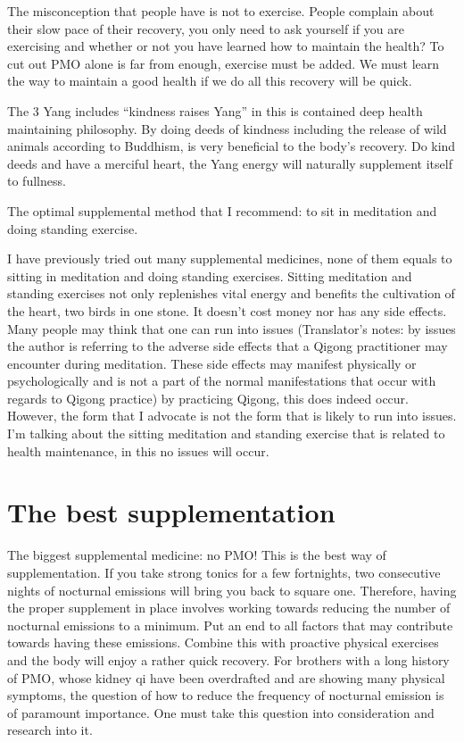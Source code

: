\documentclass[
]{book}
\begin{document}
The misconception that people have is not to exercise. People complain about their slow pace of their recovery, you only need to ask yourself if you are exercising and whether or not you have learned how to maintain the health? To cut out PMO alone is far from enough, exercise must be added. We must learn the way to maintain a good health if we do all this recovery will be quick.

The 3 Yang includes ``kindness raises Yang'' in this is contained deep health maintaining philosophy. By doing deeds of kindness including the release of wild animals according to Buddhism, is very beneficial to the body's recovery. Do kind deeds and have a merciful heart, the Yang energy will naturally supplement itself to fullness.

The optimal supplemental method that I recommend: to sit in meditation and doing standing exercise.

I have previously tried out many supplemental medicines, none of them equals to sitting in meditation and doing standing exercises. Sitting meditation and standing exercises not only replenishes vital energy and benefits the cultivation of the heart, two birds in one stone. It doesn't cost money nor has any side effects. Many people may think that one can run into issues (Translator's notes: by issues the author is referring to the adverse side effects that a Qigong practitioner may encounter during meditation. These side effects may manifest physically or psychologically and is not a part of the normal manifestations that occur with regards to Qigong practice) by practicing Qigong, this does indeed occur. However, the form that I advocate is not the form that is likely to run into issues. I'm talking about the sitting meditation and standing exercise that is related to health maintenance, in this no issues will occur.

\hypertarget{the-best-supplementation}{%
\section{The best supplementation}\label{the-best-supplementation}}

The biggest supplemental medicine: no PMO! This is the best way of supplementation. If you take strong tonics for a few fortnights, two consecutive nights of nocturnal emissions will bring you back to square one. Therefore, having the proper supplement in place involves working towards reducing the number of nocturnal emissions to a minimum. Put an end to all factors that may contribute towards having these emissions. Combine this with proactive physical exercises and the body will enjoy a rather quick recovery. For brothers with a long history of PMO, whose kidney qi have been overdrafted and are showing many physical symptoms, the question of how to reduce the frequency of nocturnal emission is of paramount importance. One must take this question into consideration and research into it.
\end{document}
